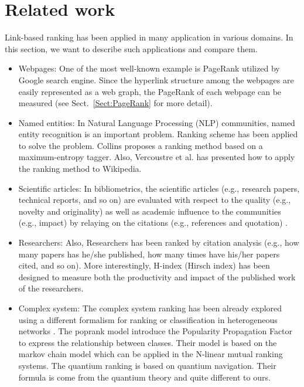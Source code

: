 \documentclass[10pt,leqno,twoside]{article}
\begin{document}
\section{Related work}\label{Sect:Related}
Link-based ranking has been applied in many application in various domains.
In this section, we want to describe such applications and compare them.
\begin{itemize}
\item Webpages:
One of the most well-known example is PageRank utilized by Google search engine.
Since the hyperlink structure among the webpages are easily represented as a web graph,
the PageRank of each webpage can be measured (see Sect.~\ref{Sect:PageRank} for more detail).

\item Named entities:
In Natural Language Processing (NLP) communities, named entity recognition is an important problem.
Ranking scheme has been applied to solve the problem. Collins \cite{Collins-ACL-02} proposes a ranking method based on a maximum-entropy tagger. Also,
Vercoustre et al. \cite{Vercoustre-SAC-08} has presented how to apply the ranking method to Wikipedia.

\item Scientific articles:
In bibliometrics, the scientific articles (e.g., research papers, technical reports, and so on) are evaluated with respect to the quality (e.g., novelty and originality) as well as academic influence to the communities (e.g., impact) by relaying on the citations (e.g., references and quotation) \cite{Cronin-JIS-01}.

\item Researchers:
Also, Researchers has been ranked by citation analysis (e.g., how many papers has he/she published, how many times have his/her papers cited, and so on). More interestingly, H-index (Hirsch index) has been designed to
measure both the productivity and impact of the published work of the researchers.
\item Complex system:
The complex system ranking has been already explored using a different formalism for ranking or classification in heterogeneous networks \cite{poprank,complexrank}.
The poprank model \cite{poprank} introduce the Popularity Propagation Factor to express the relationship between classes. Their model is based on the markov chain model which can be applied in the N-linear mutual ranking systems. The quantium ranking \cite{complexrank} is based on quantium navigation. Their formula is come from the quantium theory and quite different to ours.
\end{itemize}
\end{document}
